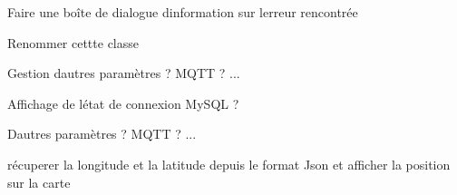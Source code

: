 
\begin{DoxyRefList}
\item[\label{todo__todo000005}%
\Hypertarget{todo__todo000005}%
Membre \hyperlink{class_communication_ae1a84ffd9317d0e4e27a6633cef43b64}{Communication\+:\+:erreur\+Client\+T\+TN} ()]Faire une boîte de dialogue d\textquotesingle{}information sur l\textquotesingle{}erreur rencontrée  
\item[\label{todo__todo000001}%
\Hypertarget{todo__todo000001}%
Classe \hyperlink{classfr_1_1campus_1_1laurainc_1_1honeybee_1_1_details_ruche_activity}{fr.campus.laurainc.honeybee.Details\+Ruche\+Activity} ]Renommer cettte classe  
\item[\label{todo__todo000003}%
\Hypertarget{todo__todo000003}%
Membre \hyperlink{classfr_1_1campus_1_1laurainc_1_1honeybee_1_1_main_activity_ae751b46f1881bda6b3b0e08025a9c044}{fr.campus.laurainc.honeybee.Main\+Activity.on\+Activity\+Result} (int request\+Code, int result\+Code, Intent intent)]Gestion d\textquotesingle{}autres paramètres ? M\+Q\+TT ? ...  
\item[\label{todo__todo000002}%
\Hypertarget{todo__todo000002}%
Membre \hyperlink{classfr_1_1campus_1_1laurainc_1_1honeybee_1_1_main_activity_aba2e570bbba3bf1be8487068d9c6c2da}{fr.campus.laurainc.honeybee.Main\+Activity.on\+Create} (Bundle saved\+Instance\+State)]Affichage de l\textquotesingle{}état de connexion My\+S\+QL ?  
\item[\label{todo__todo000004}%
\Hypertarget{todo__todo000004}%
Classe \hyperlink{classfr_1_1campus_1_1laurainc_1_1honeybee_1_1_parametres_honey_bee_activity}{fr.campus.laurainc.honeybee.Parametres\+Honey\+Bee\+Activity} ]D\textquotesingle{}autres paramètres ? M\+Q\+TT ? ...  
\item[\label{todo__todo000006}%
\Hypertarget{todo__todo000006}%
Membre \hyperlink{class_ruche_ihm_a3a3dae9de8c51344aa6e3463db9e6ad9}{Ruche\+Ihm\+:\+:recevoir\+Etat\+Client\+Connexion} (bool etat)]récuperer la longitude et la latitude depuis le format Json et afficher la position sur la carte 
\end{DoxyRefList}